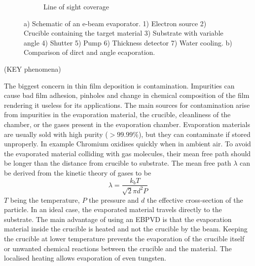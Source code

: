 \documentclass[final]{jyflluk}
\begin{document}
\begin{figure}
\begin{subfigure}[ht]{0.35\textwidth}
        \caption{Line of sight coverage} \label{fig:angle_evap}
    \end{subfigure}
    \caption{a) Schematic of an e-beam evaporator. 1) Electron source 2) Crucible containing the target material 3) Substrate with variable angle 4) Shutter 5) Pump 6) Thickness detector 7) Water cooling. b) Comparison of dirct and angle ecaporation. } \label{fig:evap}
\end{figure}




(KEY phenomena)

The biggest concern in thin film deposition is contamination. Impurities can cause bad film adhesion, pinholes and change in chemical composition of the film rendering it useless for its applications. The main sources for contamination arise from impurities in the evaporation material, the crucible, cleanliness of the chamber, or the gases present in the evaporation chamber. Evaporation materials are usually sold with high purity ($>99.99 \percent$), but they can contaminate if stored unproperly. In example Chromium oxidises quickly when in ambient air. To avoid the evaporated material colliding with gas molecules, their mean free path should be longer than the distance from crucible to substrate. The mean free path $\lambda$ can be derived from the kinetic theory of gases to be 
%
\begin{equation}
    \label{eq:mean_free}
    \lambda = \frac{k_b T}{\sqrt{2}\pi d^2 P}
 \end{equation}
 $T$ being the temperature, $P$ the pressure and $d$ the effective cross-section of the particle. In an ideal case, the evaporated material travels directly to the substrate. The main advantage of using an EBPVD is that the evaporation material inside the crucible is heated and not the crucible by the beam. Keeping the crucible at lower temperature prevents the evaporation of the crucible itself or unwanted chemical reactions between the crucible and the material. The localised heating allows evaporation of even tungsten. \cite{franssila2010introduction}
\end{document}
